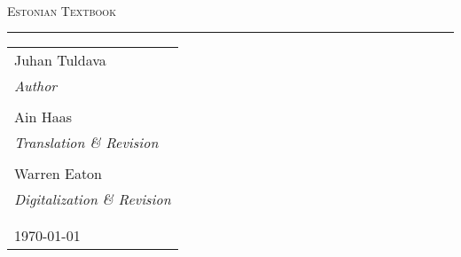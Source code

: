 \begin{titlepage}

~\\[2.5cm]

\begin{center}
\textsc{\Huge Estonian Textbook \\}
\noindent\rule{0.3\textwidth}{0.4mm}
\end{center}

\vfill

\begin{tabular}{ l }
{\large Juhan Tuldava} \\
\emph{Author} \\
\\
{\large Ain Haas} \\
\emph{Translation \& Revision} \\
\\
{\large Warren Eaton} \\
\emph{Digitalization \& Revision} \\
\\
\\
{\large \today}
\end{tabular}


\end{titlepage}
